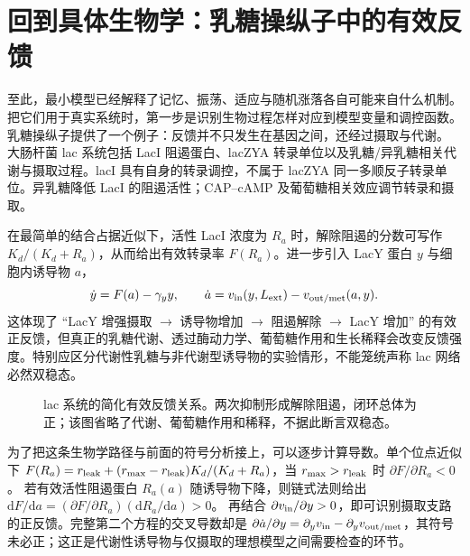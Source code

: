 \documentclass[11pt,a4paper,UTF8,fontset=fandol]{ctexart}
\newcommand{\dd}{\mathrm d}\newcommand{\R}{\mathbb R}\newcommand{\ssv}{\mathrm{ss}}
\begin{document}
\section{回到具体生物学：乳糖操纵子中的有效反馈}
至此，最小模型已经解释了记忆、振荡、适应与随机涨落各自可能来自什么机制。把它们用于真实系统时，第一步是识别生物过程怎样对应到模型变量和调控函数。乳糖操纵子提供了一个例子：反馈并不只发生在基因之间，还经过摄取与代谢。
大肠杆菌 lac 系统包括 LacI 阻遏蛋白、lacZYA 转录单位以及乳糖/异乳糖相关代谢与摄取过程。lacI 具有自身的转录调控，不属于 lacZYA 同一多顺反子转录单位。异乳糖降低 LacI 的阻遏活性；CAP--cAMP 及葡萄糖相关效应调节转录和摄取。

在最简单的结合占据近似下，活性 LacI 浓度为 $R_a$ 时，解除阻遏的分数可写作 $K_d/(K_d+R_a)$，从而给出有效转录率 $F(R_a)$。进一步引入 LacY 蛋白 $y$ 与细胞内诱导物 $a$，
\begin{equation}\dot y=F(a)-\gamma_y y,\qquad\dot a=v_{\rm in}(y,L_{\rm ext})-v_{\rm out/met}(a,y).\end{equation}
这体现了 ``LacY 增强摄取 $\to$ 诱导物增加 $\to$ 阻遏解除 $\to$ LacY 增加'' 的有效正反馈，但真正的乳糖代谢、透过酶动力学、葡萄糖作用和生长稀释会改变反馈强度。特别应区分代谢性乳糖与非代谢型诱导物的实验情形，不能笼统声称 lac 网络必然双稳态。

\begin{figure}[H]\centering
{}
\caption{lac 系统的简化有效反馈关系。两次抑制形成解除阻遏，闭环总体为正；该图省略了代谢、葡萄糖作用和稀释，不据此断言双稳态。}
\end{figure}

为了把这条生物学路径与前面的符号分析接上，可以逐步计算导数。单个位点近似下 $F(R_a)=r_{\rm leak}+(r_{\rm max}-r_{\rm leak})K_d/(K_d+R_a)$，当 $r_{\rm max}>r_{\rm leak}$ 时 $\partial F/\partial R_a<0$。
若有效活性阻遏蛋白 $R_a(a)$ 随诱导物下降，则链式法则给出 $\dd F/\dd a=(\partial F/\partial R_a)(\dd R_a/\dd a)>0$。
再结合 $\partial v_{\rm in}/\partial y>0$，即可识别摄取支路的正反馈。完整第二个方程的交叉导数却是
$\partial\dot a/\partial y=\partial_yv_{\rm in}-\partial_yv_{\rm out/met}$，其符号未必正；这正是代谢性诱导物与仅摄取的理想模型之间需要检查的环节。
\end{document}
